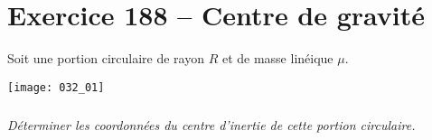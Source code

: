 \section*{Exercice 188 -- Centre de gravité}
\setcounter{exo}{0}

Soit une portion circulaire de rayon $R$ et de masse linéique $\mu$.

\begin{center}
\texttt{[image: 032\_01]}
\end{center}
\subparagraph{}
\textit{Déterminer les coordonnées du centre d'inertie de cette portion circulaire.}
\ifprof
\begin{corrige}

\end{corrige}
\else
\fi
